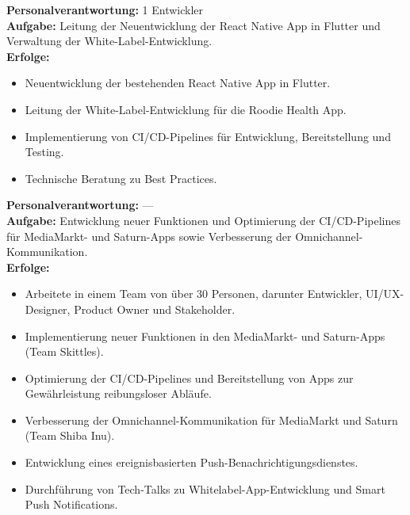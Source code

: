 \documentclass[10pt,a4paper,normalphoto]{altacv}
\begin{document}
\newpage
\begin{fullwidth}
    
\textbf{Personalverantwortung:} 1 Entwickler\\ 
\textbf{Aufgabe:} Leitung der Neuentwicklung der React Native App in Flutter und Verwaltung der White-Label-Entwicklung.\\
\textbf{Erfolge:}
\begin{itemize}
    \item Neuentwicklung der bestehenden React Native App in Flutter.
    \item Leitung der White-Label-Entwicklung für die Roodie Health App.
    \item Implementierung von CI/CD-Pipelines für Entwicklung, Bereitstellung und Testing.
    \item Technische Beratung zu Best Practices.
\end{itemize}

\vspace{1em}


\vspace{2em}
    
\textbf{Personalverantwortung:} —\\
\textbf{Aufgabe:} Entwicklung neuer Funktionen und Optimierung der CI/CD-Pipelines für MediaMarkt- und Saturn-Apps sowie Verbesserung der Omnichannel-Kommunikation.\\
\textbf{Erfolge:}
\begin{itemize}
    \item Arbeitete in einem Team von über 30 Personen, darunter Entwickler, UI/UX-Designer, Product Owner und Stakeholder.
    \item Implementierung neuer Funktionen in den MediaMarkt- und Saturn-Apps (Team Skittles).
    \item Optimierung der CI/CD-Pipelines und Bereitstellung von Apps zur Gewährleistung reibungsloser Abläufe.
    \item Verbesserung der Omnichannel-Kommunikation für MediaMarkt und Saturn (Team Shiba Inu).
    \item Entwicklung eines ereignisbasierten Push-Benachrichtigungsdienstes.
    \item Durchführung von Tech-Talks zu Whitelabel-App-Entwicklung und Smart Push Notifications.
\end{itemize}


\end{fullwidth}
\end{document}
